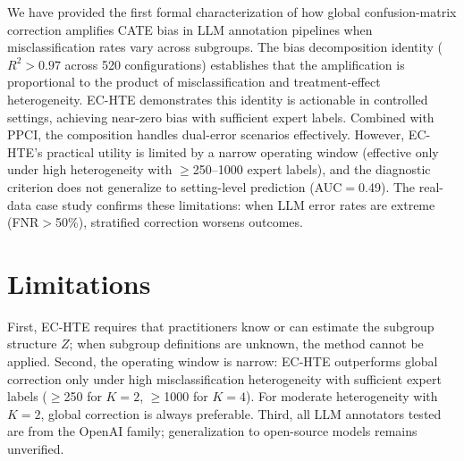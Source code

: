 \documentclass[11pt,twocolumn]{article}
\begin{document}
We have provided the first formal characterization of how global confusion-matrix correction amplifies CATE bias in LLM annotation pipelines when misclassification rates vary across subgroups. The bias decomposition identity ($R^2 > 0.97$ across 520 configurations) establishes that the amplification is proportional to the product of misclassification and treatment-effect heterogeneity. EC-HTE demonstrates this identity is actionable in controlled settings, achieving near-zero bias with sufficient expert labels. Combined with PPCI, the composition handles dual-error scenarios effectively. However, EC-HTE's practical utility is limited by a narrow operating window (effective only under high heterogeneity with $\geq$250--1000 expert labels), and the diagnostic criterion does not generalize to setting-level prediction (AUC$=$0.49). The real-data case study confirms these limitations: when LLM error rates are extreme (FNR$>$50\%), stratified correction worsens outcomes.

\section*{Limitations}

First, EC-HTE requires that practitioners know or can estimate the subgroup structure $Z$; when subgroup definitions are unknown, the method cannot be applied. Second, the operating window is narrow: EC-HTE outperforms global correction only under high misclassification heterogeneity with sufficient expert labels ($\geq$250 for $K{=}2$, $\geq$1000 for $K{=}4$). For moderate heterogeneity with $K{=}2$, global correction is always preferable. Third, all LLM annotators tested are from the OpenAI family; generalization to open-source models remains unverified.


\end{document}
